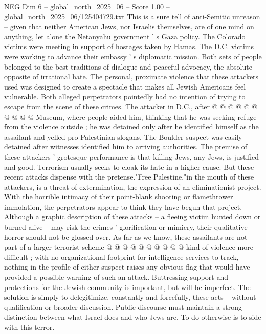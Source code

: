 \begin{textsample}{NEG Dim 6 – global\_north\_2025\_06 – Score 1.00 – global\_north\_2025\_06/125404729.txt}
This is a sure tell of anti-Semitic unreason -- given that neither American Jews, nor Israelis themselves, are of one mind on anything, let alone the Netanyahu government ' s Gaza policy.
The Colorado victims were meeting in support of hostages taken by Hamas.
The D.C. victims were working to advance their embassy ' s diplomatic mission.
Both sets of people belonged to the best traditions of dialogue and peaceful advocacy, the absolute opposite of irrational hate.
The personal, proximate violence that these attackers used was designed to create a spectacle that makes all Jewish Americans feel vulnerable.
Both alleged perpetrators pointedly had no intention of trying to escape from the scene of these crimes.
The attacker in D.C., after @ @ @ @ @ @ @ @ @ @ Museum, where people aided him, thinking that he was seeking refuge from the violence outside ; he was detained only after he identified himself as the assailant and yelled pro-Palestinian slogans.
The Boulder suspect was easily detained after witnesses identified him to arriving authorities.
The premise of these attackers ' grotesque performance is that killing Jews, any Jews, is justified and good.
Terrorism usually seeks to cloak its hate in a higher cause.
But these recent attacks dispense with the pretense."Free Palestine,"in the mouth of these attackers, is a threat of extermination, the expression of an eliminationist project.
With the horrible intimacy of their point-blank shooting or flamethrower immolation, the perpetrators appear to think they have begun that project.
Although a graphic description of these attacks -- a fleeing victim hunted down or burned alive -- may risk the crimes ' glorification or mimicry, their qualitative horror should not be glossed over.
As far as we know, these assailants are not part of a larger terrorist scheme @ @ @ @ @ @ @ @ @ @ kind of violence more difficult ; with no organizational footprint for intelligence services to track, nothing in the profile of either suspect raises any obvious flag that would have provided a possible warning of such an attack.
Buttressing support and protections for the Jewish community is important, but will be imperfect.
The solution is simply to delegitimize, constantly and forcefully, these acts -- without qualification or broader discussion.
Public discourse must maintain a strong distinction between what Israel does and who Jews are.
To do otherwise is to side with this terror.

\end{textsample}
